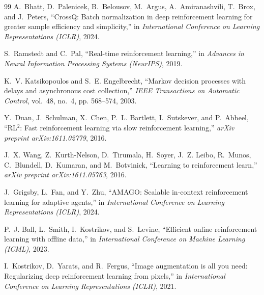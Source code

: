 \documentclass[conference]{IEEEtran}
\begin{document}
\begin{thebibliography}{99}
A.~Bhatt, D.~Palenicek, B.~Belousov, M.~Argus, A.~Amiranashvili, T.~Brox, and J.~Peters, ``CrossQ: Batch normalization in deep reinforcement learning for greater sample efficiency and simplicity,'' in \emph{International Conference on Learning Representations (ICLR)}, 2024.




S.~Ramstedt and C.~Pal, ``Real-time reinforcement learning,'' in \emph{Advances in Neural Information Processing Systems (NeurIPS)}, 2019.




K.~V. Katsikopoulos and S.~E. Engelbrecht, ``Markov decision processes with delays and asynchronous cost collection,'' \emph{IEEE Transactions on Automatic Control}, vol.~48, no.~4, pp. 568--574, 2003.




Y.~Duan, J.~Schulman, X.~Chen, P.~L. Bartlett, I.~Sutskever, and P.~Abbeel, ``RL$^2$: Fast reinforcement learning via slow reinforcement learning,'' \emph{arXiv preprint arXiv:1611.02779}, 2016.




J.~X. Wang, Z.~Kurth-Nelson, D.~Tirumala, H.~Soyer, J.~Z. Leibo, R.~Munos, C.~Blundell, D.~Kumaran, and M.~Botvinick, ``Learning to reinforcement learn,'' \emph{arXiv preprint arXiv:1611.05763}, 2016.




J.~Grigsby, L.~Fan, and Y.~Zhu, ``AMAGO: Scalable in-context reinforcement learning for adaptive agents,'' in \emph{International Conference on Learning Representations (ICLR)}, 2024.




P.~J. Ball, L.~Smith, I.~Kostrikov, and S.~Levine, ``Efficient online reinforcement learning with offline data,'' in \emph{International Conference on Machine Learning (ICML)}, 2023.




I.~Kostrikov, D.~Yarats, and R.~Fergus, ``Image augmentation is all you need: Regularizing deep reinforcement learning from pixels,'' in \emph{International Conference on Learning Representations (ICLR)}, 2021.




\end{thebibliography}
\end{document}
